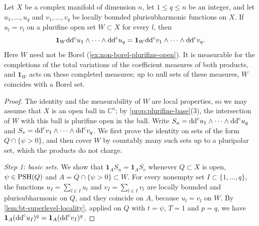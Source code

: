 \begin{theorem}\label{thm:bt-plurifine-locality}
Let $X$ be a complex manifold of dimension $n$, let $1\le q\le n$ be an integer, and let $u_1,\ldots,u_q$ and $v_1,\ldots,v_q$ be locally bounded plurisubharmonic functions on $X$. If $u_l=v_l$ on a plurifine open set $W\subset X$ for every $l$, then
\[
 \mathbf1_W\mathrm{dd}^{\mathrm{c}} u_1\wedge\cdots\wedge\mathrm{dd}^{\mathrm{c}} u_q
     =\mathbf1_W\mathrm{dd}^{\mathrm{c}} v_1\wedge\cdots\wedge\mathrm{dd}^{\mathrm{c}} v_q.
\]
Here $W$ need not be Borel (\cref{ex:non-borel-plurifine-open}). It is measurable for the completions of the total variations of the coefficient measures of both products, and $\mathbf1_W$ acts on these completed measures; up to null sets of these measures, $W$ coincides with a Borel set.
\end{theorem}
\begin{proof}
The identity and the measurability of $W$ are local properties, so we may assume that $X$ is an open ball in $\mathbb C^n$; by \cref{prop:plurifine-base}(3), the intersection of $W$ with this ball is plurifine open in the ball. Write $S_u=\mathrm{dd}^{\mathrm{c}} u_1\wedge\cdots\wedge\mathrm{dd}^{\mathrm{c}} u_q$ and $S_v=\mathrm{dd}^{\mathrm{c}} v_1\wedge\cdots\wedge\mathrm{dd}^{\mathrm{c}} v_q$. We first prove the identity on sets of the form $Q\cap\{\psi>0\}$, and then cover $W$ by countably many such sets up to a pluripolar set, which the products do not charge.

\emph{Step 1: basic sets.} We show that $\mathbf1_AS_u=\mathbf1_AS_v$ whenever $Q\subset X$ is open, $\psi\in\mathrm{PSH}(Q)$ and $A=Q\cap\{\psi>0\}\subset W$. For every nonempty set $I\subset\{1,\ldots,q\}$, the functions $u_I=\sum_{l\in I}u_l$ and $v_I=\sum_{l\in I}v_l$ are locally bounded and plurisubharmonic on $Q$, and they coincide on $A$, because $u_l=v_l$ on $W$. By \cref{lem:bt-superlevel-locality}, applied on $Q$ with $t=\psi$, $T=1$ and $p=q$, we have $\mathbf1_A(\mathrm{dd}^{\mathrm{c}} u_I)^q=\mathbf1_A(\mathrm{dd}^{\mathrm{c}} v_I)^q$.


\end{proof}
